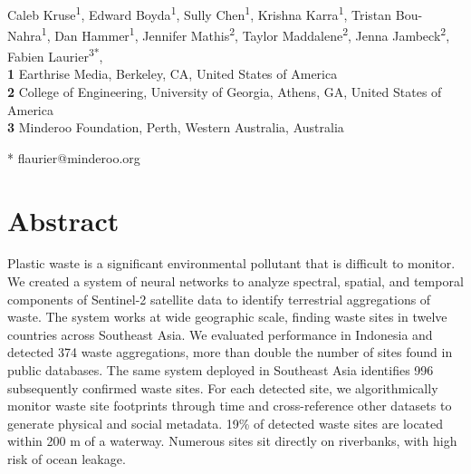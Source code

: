 \documentclass[10pt,letterpaper]{article}
\begin{document}
\vspace*{0.2in}

\begin{flushleft}
{\Large
\textbf{} %
}
\newline
\\
Caleb Kruse\textsuperscript{1},
Edward Boyda\textsuperscript{1},
Sully Chen\textsuperscript{1},
Krishna Karra\textsuperscript{1},
Tristan Bou-Nahra\textsuperscript{1},
Dan Hammer\textsuperscript{1},
Jennifer Mathis\textsuperscript{2},
Taylor Maddalene\textsuperscript{2},
Jenna Jambeck\textsuperscript{2},
Fabien Laurier\textsuperscript{3*},
\\
\bigskip
\textbf{1} Earthrise Media, Berkeley, CA, United States of America
\\
\textbf{2} College of Engineering, University of Georgia, Athens, GA, United States of America
\\
\textbf{3} Minderoo Foundation, Perth, Western Australia, Australia
\\
\bigskip

% 
%

* flaurier@minderoo.org

\end{flushleft}
\section*{Abstract}
Plastic waste is a significant environmental pollutant that is difficult to monitor. We created a system of neural networks to analyze spectral, spatial, and temporal components of Sentinel-2 satellite data to identify terrestrial aggregations of waste. The system works at wide geographic scale, finding waste sites in twelve countries across Southeast Asia. We evaluated performance in Indonesia and detected 374 waste aggregations, more than double the number of sites found in public databases. The same system deployed in Southeast Asia identifies 996 subsequently confirmed waste sites. For each detected site, we algorithmically monitor waste site footprints through time and cross-reference other datasets to generate physical and social metadata. 19\% of detected waste sites are located within 200 m of a waterway. Numerous sites sit directly on riverbanks, with high risk of ocean leakage.
\end{document}
